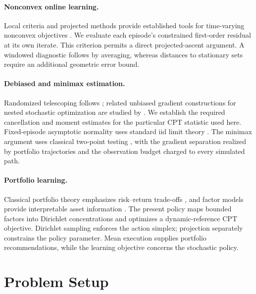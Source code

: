\documentclass[11pt]{article}
\newcommand{\1}{\mathbf 1}
\newcommand{\CPT}{\ensuremath{\mathrm{CPT}}\xspace}
\begin{document}
\paragraph{Nonconvex online learning.}
Local criteria and projected methods provide established tools for time-varying nonconvex objectives \citep{hazan2017efficient,aydore2019dynamic,hallak2021regret}. We evaluate each episode's constrained first-order residual at its own iterate. This criterion permits a direct projected-ascent argument. A windowed diagnostic follows by averaging, whereas distances to stationary sets require an additional geometric error bound.

\paragraph{Debiased and minimax estimation.}
Randomized telescoping follows \citet{rhee2015unbiased}; related unbiased gradient constructions for nested stochastic optimization are studied by \citet{goda2023unbiased}. We establish the required cancellation and moment estimates for the particular \CPT statistic used here. Fixed-episode asymptotic normality uses standard iid limit theory \citep{vandervaart1998asymptotic}. The minimax argument uses classical two-point testing \citep{tsybakov2009introduction}, with the gradient separation realized by portfolio trajectories and the observation budget charged to every simulated path.

\paragraph{Portfolio learning.}
Classical portfolio theory emphasizes risk--return trade-offs \citep{markowitz1952portfolio}, and factor models provide interpretable asset information \citep{fama1993common}. The present policy maps bounded factors into Dirichlet concentrations and optimizes a dynamic-reference \CPT objective. Dirichlet sampling enforces the action simplex; projection separately constrains the policy parameter. Mean execution supplies portfolio recommendations, while the learning objective concerns the stochastic policy.

\section{Problem Setup}\label{sec:setup}
\end{document}
